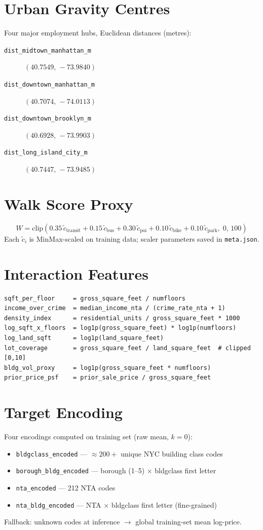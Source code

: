 \documentclass[11pt, a4paper, twoside]{report}
\begin{document}
\section{Urban Gravity Centres}
Four major employment hubs, Euclidean distances (metres):
\begin{description}
  \item[\texttt{dist\_midtown\_manhattan\_m}]  $(40.7549,\,-73.9840)$
  \item[\texttt{dist\_downtown\_manhattan\_m}] $(40.7074,\,-74.0113)$
  \item[\texttt{dist\_downtown\_brooklyn\_m}]  $(40.6928,\,-73.9903)$
  \item[\texttt{dist\_long\_island\_city\_m}]  $(40.7447,\,-73.9485)$
\end{description}

\section{Walk Score Proxy}
\begin{equation}
  W = \text{clip}\!\left(
    0.35\,\tilde{c}_\text{transit} +
    0.15\,\tilde{c}_\text{bus} +
    0.30\,\tilde{c}_\text{poi} +
    0.10\,\tilde{c}_\text{bike} +
    0.10\,\tilde{c}_\text{park},\;
    0,\,100
  \right)
\end{equation}
Each $\tilde{c}_i$ is MinMax-scaled on training data; scaler parameters saved in
\texttt{meta.json}.

\section{Interaction Features}
\begin{lstlisting}
sqft_per_floor     = gross_square_feet / numfloors
income_over_crime  = median_income_nta / (crime_rate_nta + 1)
density_index      = residential_units / gross_square_feet * 1000
log_sqft_x_floors  = log1p(gross_square_feet) * log1p(numfloors)
log_land_sqft      = log1p(land_square_feet)
lot_coverage       = gross_square_feet / land_square_feet  # clipped [0,10]
bldg_vol_proxy     = log1p(gross_square_feet * numfloors)
prior_price_psf    = prior_sale_price / gross_square_feet
\end{lstlisting}

\section{Target Encoding}
Four encodings computed on training set (raw mean, $k=0$):
\begin{itemize}
  \item \texttt{bldgclass\_encoded} --- $\approx 200+$ unique NYC building class codes
  \item \texttt{borough\_bldg\_encoded} --- borough (1--5) $\times$ bldgclass first letter
  \item \texttt{nta\_encoded} --- 212 NTA codes
  \item \texttt{nta\_bldg\_encoded} --- NTA $\times$ bldgclass first letter (fine-grained)
\end{itemize}
Fallback: unknown codes at inference $\to$ global training-set mean log-price.
\end{document}

